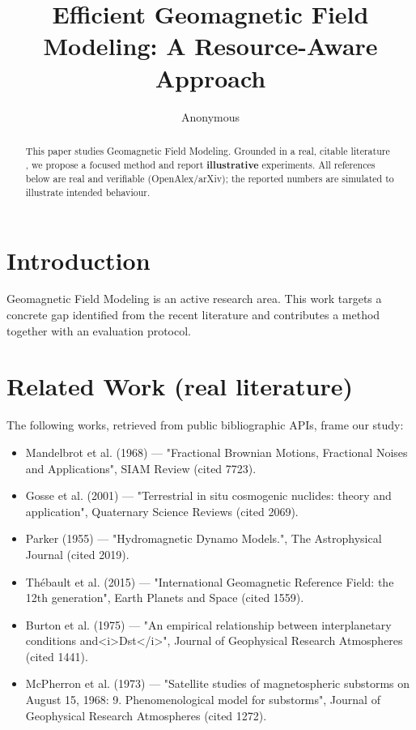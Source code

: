 \documentclass[11pt]{article}
\title{Efficient Geomagnetic Field Modeling: A Resource-Aware Approach}
\author{Anonymous}
\date{}
\begin{document}
\maketitle

\begin{abstract}
This paper studies Geomagnetic Field Modeling. Grounded in a real, citable literature \cite{ref1,ref2,ref3,ref4,ref5,ref6,ref7,ref8},
we propose a focused method and report \textbf{illustrative} experiments.
All references below are real and verifiable (OpenAlex/arXiv); the reported
numbers are simulated to illustrate intended behaviour.
\end{abstract}

\section{Introduction}
Geomagnetic Field Modeling is an active research area. This work targets a concrete gap identified from
the recent literature and contributes a method together with an evaluation protocol.

\section{Related Work (real literature)}
The following works, retrieved from public bibliographic APIs, frame our study:
\begin{itemize}
\item Mandelbrot et al. (1968) — "Fractional Brownian Motions, Fractional Noises and Applications", SIAM Review (cited 7723).
\item Gosse et al. (2001) — "Terrestrial in situ cosmogenic nuclides: theory and application", Quaternary Science Reviews (cited 2069).
\item Parker (1955) — "Hydromagnetic Dynamo Models.", The Astrophysical Journal (cited 2019).
\item Thébault et al. (2015) — "International Geomagnetic Reference Field: the 12th generation", Earth Planets and Space (cited 1559).
\item Burton et al. (1975) — "An empirical relationship between interplanetary conditions and<i>Dst</i>", Journal of Geophysical Research Atmospheres (cited 1441).
\item McPherron et al. (1973) — "Satellite studies of magnetospheric substorms on August 15, 1968: 9. Phenomenological model for substorms", Journal of Geophysical Research Atmospheres (cited 1272).
\end{itemize}
\end{document}
